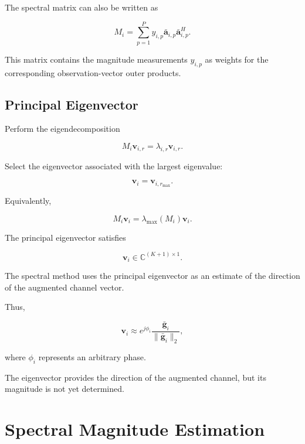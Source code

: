 \documentclass[12pt,a4paper]{article}
\begin{document}
The spectral matrix can also be written as

\begin{equation}
M_i
=
\sum_{p=1}^{P}
y_{i,p}
\bar{\mathbf a}_{i,p}
\bar{\mathbf a}_{i,p}^{H}.
\tag{262}
\end{equation}

This matrix contains the magnitude measurements $y_{i,p}$ as weights for the corresponding observation-vector outer products.

\subsection{Principal Eigenvector}

Perform the eigendecomposition

\begin{equation}
\boxed{
M_i\mathbf v_{i,r}
=
\lambda_{i,r}\mathbf v_{i,r}
}.
\tag{263}
\end{equation}

Select the eigenvector associated with the largest eigenvalue:

\begin{equation}
\boxed{
\mathbf v_i
=
\mathbf v_{i,r_{\max}}
}.
\tag{264}
\end{equation}

Equivalently,

\begin{equation}
M_i\mathbf v_i
=
\lambda_{\max}(M_i)\mathbf v_i.
\tag{265}
\end{equation}

The principal eigenvector satisfies

\begin{equation}
\boxed{
\mathbf v_i
\in
\mathbb C^{(K+1)\times1}
}.
\tag{266}
\end{equation}

The spectral method uses the principal eigenvector as an estimate of the direction of the augmented channel vector.

Thus,

\begin{equation}
\mathbf v_i
\approx
e^{j\phi_i}
\frac{\bar{\mathbf g}_i}
{\|\bar{\mathbf g}_i\|_2},
\tag{267}
\end{equation}

where $\phi_i$ represents an arbitrary phase.

The eigenvector provides the direction of the augmented channel, but its magnitude is not yet determined.

\section{Spectral Magnitude Estimation}
\end{document}
